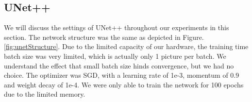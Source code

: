\subsection{UNet++}
We will discuss the settings of UNet++ throughout our experiments in this section. The network structure was the same as depicted in Figure.\ref{fig:unetStructure}. Due to the limited capacity of our hardware, the training time batch size was very limited, which is actually only 1 picture per batch. We understand the effect that small batch size hinds convergence, but we had no choice. The optimizer was SGD, with a learning rate of 1e-3, momentum of 0.9 and weight decay of 1e-4. We were only able to train the network for 100 epochs due to the limited memory.

